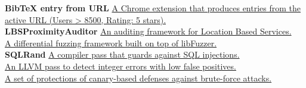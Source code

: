 
\begin{cvparagraph}

\textbf{BibTeX entry from URL} \hspace*{2pt} \href{https://chrome.google.com/webstore/detail/bibtex-entry-from-url/mgpmgkhhbjgkpnanlmlhibjfgpdpgjec} {A Chrome extension that produces  entries from the active URL (Users > 8500, Rating: 5 stars).}\\
\textbf{LBSProximityAuditor} \hspace*{7pt} \href{https://github.com/nettrino/LBSProximityAuditor}{An auditing framework for Location Based Services.}\\
\textbf{\nezha} \hspace*{69pt} \href{https://github.com/nezha-dt/nezha}
    {A differential fuzzing framework built on top of libFuzzer.}\\
\textbf{SQLRand} \hspace*{58pt}
\href{https://github.com/nettrino/SQLRand}{A compiler pass that guards against SQL injections.}\\
\textbf{\intflow} \hspace*{59pt} \href{https://github.com/nettrino/IntFlow}{An LLVM pass to detect integer errors with low false positives.}\\
\textbf{\dynaguard} \hspace*{46pt}
\href{https://github.com/nettrino/DynaGuard}{A set of protections of canary-based defenses against brute-force attacks.}
\end{cvparagraph}

